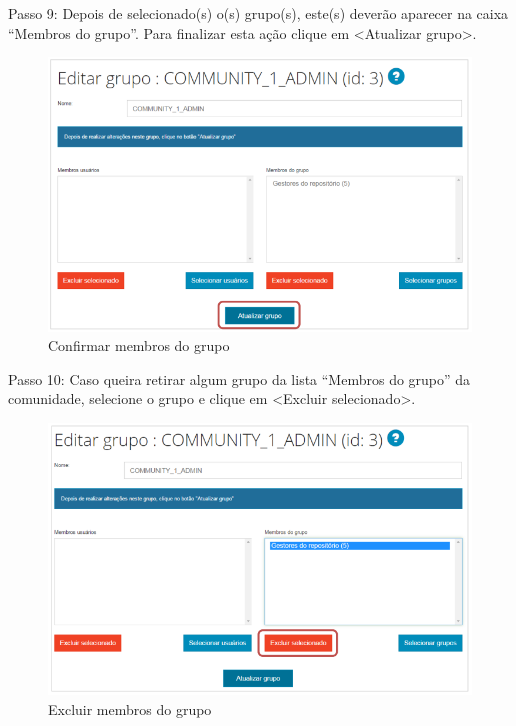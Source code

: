 \documentclass[12pt,hidelinks]{article}
\begin{document}
    Passo 9: Depois de selecionado(s) o(s) grupo(s), este(s) deverão aparecer na caixa “Membros do grupo”. Para finalizar esta ação clique em <Atualizar grupo>.
    
    \begin{figure}[!htp]
                \centering
                \includegraphics[scale=0.7]{figura/Figura26.png}
                \caption{Confirmar membros do grupo}
            \label{Rotulo}
        \end{figure}
        
\newpage
    Passo 10: Caso queira retirar algum grupo da lista “Membros do grupo” da comunidade, selecione o grupo e clique em <Excluir selecionado>.
    
    \begin{figure}[!htp]
                \centering
                \includegraphics[scale=0.7]{figura/Figura27.png}
                \caption{Excluir membros do grupo}
            \label{Rotulo}
        \end{figure}
        
\end{document}
